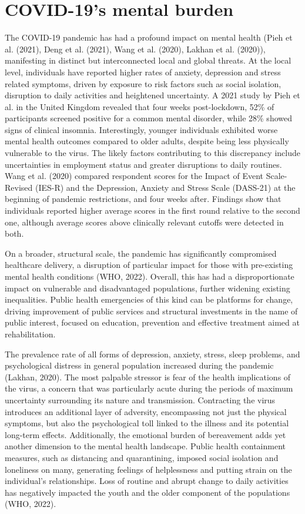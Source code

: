 \section{COVID-19's mental burden}
    The COVID-19 pandemic has had a profound impact on mental health (Pieh et al. (2021), Deng et al. (2021), Wang et al. (2020), Lakhan et al. (2020)), manifesting in distinct but interconnected local and global threats. At the local level, individuals have reported higher rates of anxiety, depression and stress related symptoms, driven by exposure to risk factors such as social isolation, disruption to daily activities and heightened uncertainty. 
    A 2021 study by Pieh et al. in the United Kingdom revealed that four weeks post-lockdown, 52\% of participants screened positive for a common mental disorder, while 28\% showed signs of clinical insomnia. Interestingly, younger individuals exhibited worse mental health outcomes compared to older adults, despite being less physically vulnerable to the virus. The likely factors contributing to this discrepancy include uncertainties in employment status and greater disruptions to daily routines. 
    Wang et al. (2020) compared respondent scores for the Impact of Event Scale-Revised (IES-R) and the Depression, Anxiety and Stress Scale (DASS-21) at the beginning of pandemic restrictions, and four weeks after. Findings show that individuals reported higher average scores in the first round relative to the second one, although average scores above clinically relevant cutoffs were detected in both. 

    On a broader, structural scale, the pandemic has significantly compromised healthcare delivery, a disruption of particular impact for those with pre-existing mental health conditions (WHO, 2022). Overall, this has had a disproportionate impact on vulnerable and disadvantaged populations, further widening existing inequalities. 
    Public health emergencies of this kind can be platforms for change, driving improvement of public services and structural investments in the name of public interest, focused on education, prevention and effective treatment aimed at rehabilitation. 

    The prevalence rate of all forms of depression, anxiety, stress, sleep problems, and psychological distress in general population increased during the pandemic (Lakhan, 2020). 
    The most palpable stressor is fear of the health implications of the virus, a concern that was particularly acute during the periods of maximum uncertainty surrounding its nature and transmission. Contracting the virus introduces an additional layer of adversity, encompassing not just the physical symptoms, but also the psychological toll linked to the illness and its potential long-term effects. Additionally, the emotional burden of bereavement adds yet another dimension to the mental health landscape.
    Public health containment measures, such as distancing and quarantining, imposed social isolation and loneliness on many, generating feelings of helplessness and putting strain on the individual's relationships. Loss of routine and abrupt change to daily activities has negatively impacted the youth and the older component of the populations (WHO, 2022). 

